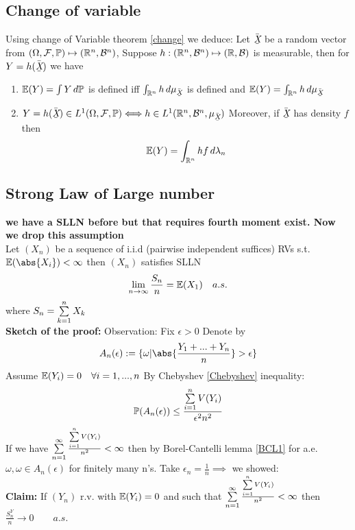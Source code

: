 \subsection{Change of variable}
Using change of Variable theorem \ref{change} we deduce:
Let $\doublebar{X}$ be a random vector from $(\Omega, \mathcal{F}, \mathbb{P}) \mapsto (\mathbb{R}^n, \mathcal{B}^n)$, Suppose $h:(\mathbb{R}^n, \mathcal{B}^n) \mapsto (\mathbb{R}, \mathcal{B}) $ is measurable, then for $Y = h(\doublebar{X})$ we have 
\begin{enumerate}
    \item $\mathbb{E}(Y) = \int Y \mathop{}\!d \mathbb{P}$ is defined iff $\int_{\R^n} h \diff\mu_{\doublebar{X}}$ is defined and $\E(Y) = \int_{\R^n} h \diff\mu_{\doublebar{X}}$
    \item $Y = h(\doublebar{X}) \in \ls{1}(\Omega, \F, \prob) \Longleftrightarrow h\in \ls{1}(\R^n, \B^n, \mu_{\doublebar{X}})$ Moreover, if $\doublebar{X}$ has density $f$ then 
    \begin{equation*}
        \mathbb{E}(Y) = \int_{\mathbb{R}^n} hf \mathop{}\!d\lambda_n
    \end{equation*}
\end{enumerate}
\subsection{Strong Law of Large number}
\textbf{we have a SLLN before but that requires fourth moment exist. Now we drop this assumption} \\ 
Let $(X_n)$ be a sequence of i.i.d (pairwise independent suffices) RVs s.t. $\E(\abs{X_i}) < \infty$ then $(X_n)$ satisfies SLLN
\begin{equation*}
    \lim\limits_{n\rightarrow \infty} \frac{S_n}{n} = \mathbb{E}(X_1) \quad a.s.
\end{equation*}where $S_n = \sum\limits_{k=1}^n X_k$ \\
\pf 
\textbf{Sketch of the proof:} Observation: Fix $\epsilon > 0$ Denote by \begin{equation*}
    A_n(\epsilon) := \{\omega|\abs{\frac{Y_1+...+Y_n}{n}} > \epsilon\}
\end{equation*}Assume $\mathbb{E}(Y_i) = 0 \quad \forall i = 1,...,n$ By Chebyshev \ref{Chebyshev} inequality:
\begin{equation*}
    \mathbb{P}(A_n(\epsilon)) \leq \frac{\sum\limits_{i=1}^n V(Y_i)}{\epsilon^2 n^2}
\end{equation*}If we have $\sum\limits_{n=1}^\infty \frac{\sum\limits_{i=1}^n V(Y_i)}{n^2} < \infty$ then by Borel-Cantelli lemma \ref{BCL1} for a.e. $\omega, \omega \in A_n(\epsilon)$ for finitely many n's. Take $\epsilon_n = \frac{1}{n} \implies$ we showed: \\
\textbf{Claim:} If $(Y_n)$ r.v. with $\mathbb{E}(Y_i) = 0$ and such that $\sum\limits_{n=1}^\infty \frac{\sum\limits_{i=1}^n V(Y_i)}{n^2} < \infty$ then $\frac{S_n^Y}{n} \rightarrow 0 \qquad a.s.$

